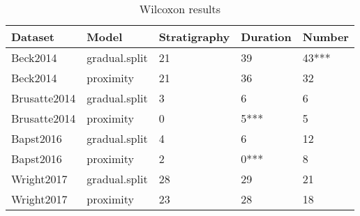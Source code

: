 \begin{table}[ht]
\centering
\begin{tabular}{lllll}
  \hline
Dataset & Model & Stratigraphy & Duration & Number \\ 
  \hline
Beck2014 & gradual.split & 21 & 39 & 43*** \\ 
  Beck2014 & proximity & 21 & 36 & 32 \\ 
  Brusatte2014 & gradual.split & 3 & 6 & 6 \\ 
  Brusatte2014 & proximity & 0 & 5*** & 5 \\ 
  Bapst2016 & gradual.split & 4 & 6 & 12 \\ 
  Bapst2016 & proximity & 2 & 0*** & 8 \\ 
  Wright2017 & gradual.split & 28 & 29 & 21 \\ 
  Wright2017 & proximity & 23 & 28 & 18 \\ 
   \hline
\end{tabular}
\caption{Wilcoxon results} 
\end{table}
